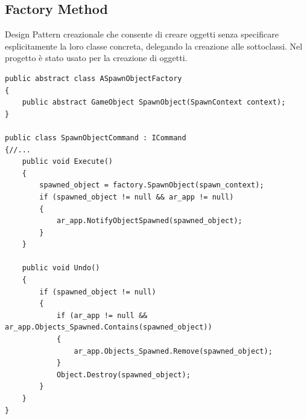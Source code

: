 \subsection{Factory Method}
Design Pattern creazionale che consente di creare oggetti senza specificare esplicitamente la loro classe concreta, delegando la creazione alle sottoclassi. Nel progetto è stato usato per la creazione di oggetti.
\begin{lstlisting}[language={[Sharp]C}]
public abstract class ASpawnObjectFactory
{
    public abstract GameObject SpawnObject(SpawnContext context);
}

public class SpawnObjectCommand : ICommand
{//...
    public void Execute()
    {
        spawned_object = factory.SpawnObject(spawn_context);
        if (spawned_object != null && ar_app != null)
        {
            ar_app.NotifyObjectSpawned(spawned_object);
        }
    }

    public void Undo()
    {
        if (spawned_object != null)
        {
            if (ar_app != null && ar_app.Objects_Spawned.Contains(spawned_object))
            {
                ar_app.Objects_Spawned.Remove(spawned_object);
            }
            Object.Destroy(spawned_object);
        }
    }
}
\end{lstlisting}



